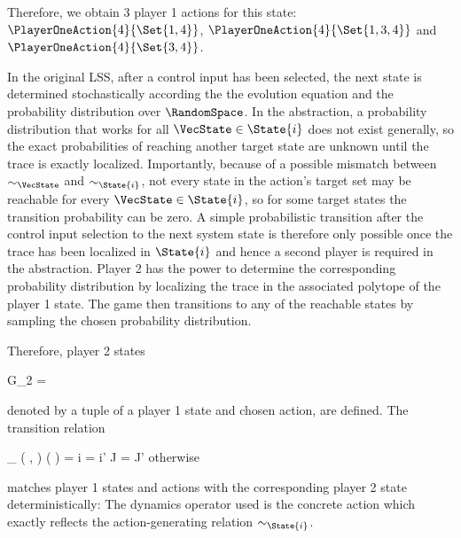    Therefore, we obtain 3 player 1 actions for this state: $\PlayerOneAction{4}{\Set{1, 4}}$, $\PlayerOneAction{4}{\Set{1, 3, 4}}$ and $\PlayerOneAction{4}{\Set{3, 4}}$.
\stopsubsection


\startsubsection[title={Player 2}]

    In the original LSS, after a control input has been selected, the next state is determined stochastically according the the evolution equation and the probability distribution over $\RandomSpace$.
    In the abstraction, a probability distribution that works for all $\VecState \in \State{i}$ does not exist generally, so the exact probabilities of reaching another target state are unknown until the trace is exactly localized.
    Importantly, because of a possible mismatch between $\sim_\VecState$ and $\sim_{\State{i}}$, not every state in the action's target set may be reachable for every $\VecState \in \State{i}$, so for some target states the transition probability can be zero.
    A simple probabilistic transition after the control input selection to the next system state is therefore only possible once the trace has been localized in $\State{i}$ and hence a second player is required in the abstraction.
    Player 2 has the power to determine the corresponding probability distribution by localizing the trace in the associated polytope of the player 1 state.
    The game then transitions to any of the reachable states by sampling the chosen probability distribution.

    Therefore, player 2 states

    \startformula
        G_2 =  \EndComma
    \stopformula

    denoted by a tuple of a player 1 state and chosen action, are defined.
    The transition relation

    \startformula
        \Transition_\GameGraph
            \Big( ,  \Big)
            \Big(  \Big)
        = \startmathcases
            \MC \startgathered
                    \NC \StartIf i = i' \MidAnd J = J'
                    \NR
                    \NC \quad \MidAnd {} \neq \emptyset
                    \NR
                \stopgathered
            \NR
            \NC otherwise
            \NR
        \stopmathcases
    \stopformula

    matches player 1 states and actions with the corresponding player 2 state deterministically:
    The dynamics operator used is the concrete action which exactly reflects the action-generating relation $\sim_{\State {i}}$.

